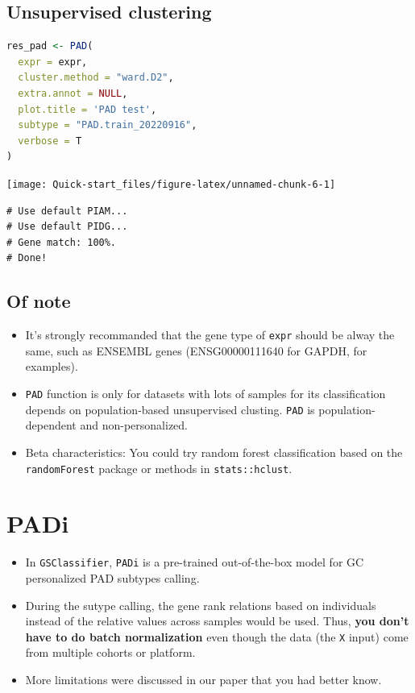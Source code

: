 \documentclass[
  12pt,
]{book}
\newcommand{\passthrough}[1]{#1}
\begin{document}
\hypertarget{unsupervised-clustering}{%
\subsection{Unsupervised clustering}\label{unsupervised-clustering}}

\begin{lstlisting}[language=R]
res_pad <- PAD(
  expr = expr,
  cluster.method = "ward.D2",
  extra.annot = NULL,
  plot.title = 'PAD test',
  subtype = "PAD.train_20220916",
  verbose = T
)
\end{lstlisting}

\begin{center}\texttt{[image: Quick-start\_files/figure-latex/unnamed-chunk-6-1]} \end{center}

\begin{lstlisting}
# Use default PIAM... 
# Use default PIDG... 
# Gene match: 100%. 
# Done!
\end{lstlisting}

\hypertarget{of-note}{%
\subsection{Of note}\label{of-note}}

\begin{itemize}
\item
  It's strongly recommanded that the gene type of \passthrough{\lstinline!expr!} should be alway the same, such as ENSEMBL genes (ENSG00000111640 for GAPDH, for examples).
\item
  \passthrough{\lstinline!PAD!} function is only for datasets with lots of samples for its classification depends on population-based unsupervised clusting. \passthrough{\lstinline!PAD!} is population-dependent and non-personalized.
\item
  Beta characteristics: You could try random forest classification based on the \passthrough{\lstinline!randomForest!} package or methods in \passthrough{\lstinline!stats::hclust!}.
\end{itemize}

\hypertarget{padi}{%
\section{PADi}\label{padi}}

\begin{itemize}
\item
  In \passthrough{\lstinline!GSClassifier!}, \passthrough{\lstinline!PADi!} is a pre-trained out-of-the-box model for GC personalized PAD subtypes calling.
\item
  During the sutype calling, the gene rank relations based on individuals instead of the relative values across samples would be used. Thus, \textbf{you don't have to do batch normalization} even though the data (the \passthrough{\lstinline!X!} input) come from multiple cohorts or platform.
\item
  More limitations were discussed in our paper that you had better know.
\end{itemize}
\end{document}
